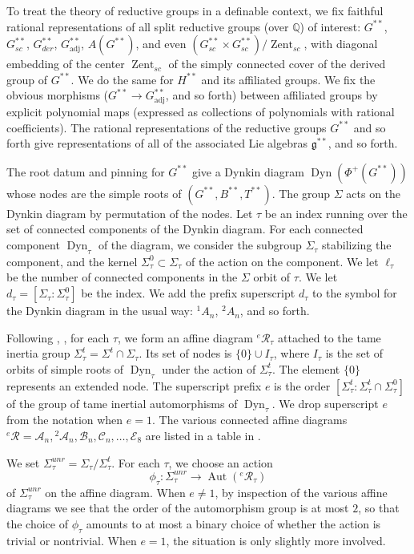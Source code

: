 \documentclass[12pt]{amsart}
\newcommand{\op}[1]{\operatorname{#1}}
\newcommand{\ring}[1]{{\mathbb #1}}
\newcommand{\cal}[1]{\mathcal{#1}}
\def\R{\cal{R}}
\newcommand{\fg}{\mathfrak{g}}
\theoremstyle{plain}
\theoremstyle{definition}
\begin{document}
To treat the theory of reductive groups in a definable context, we fix
faithful rational representations of all split reductive groups (over
$\ring{Q}$) of interest: $G^{**}$, $G^{**}_{sc}$, $G^{**}_{der}$,
$G^{**}_{\op{adj}}$, $A(G^{**})$, and even $(G^{**}_{sc}\times
G^{**}_{sc})/\op{Zent}_{sc}$, with diagonal embedding of the center
$\op{Zent}_{sc}$ of the simply connected cover of the derived group of
$G^{**}$.  We do the same for $H^{**}$ and its affiliated groups.  We
fix the obvious morphisms ($G^{**}\to G^{**}_{\op{adj}}$, and so forth)
between affiliated groups by explicit polynomial maps (expressed as
collections of polynomials with rational coefficients).  The rational
representations of the reductive groups $G^{**}$ and so forth give
representations of all of the associated Lie algebras $\fg^{**}$, and
so forth.

The root datum and pinning for $G^{**}$ give a Dynkin diagram
$\op{Dyn}(\Phi^+(G^{**}))$ whose nodes are the simple roots of
$(G^{**},B^{**},T^{**})$.  The group $\Sigma$ acts on the Dynkin
diagram by permutation of the nodes.  Let $\tau$ be an index running
over the set of connected components of the Dynkin diagram.  For each
connected component $\op{Dyn}_\tau$ of the diagram, we consider the
subgroup $\Sigma_\tau$ stabilizing the component, and the kernel
$\Sigma^0_\tau\subset \Sigma_\tau$ of the action on the component.
We let $\ell_\tau$ be the number of connected components in the
$\Sigma$ orbit of $\tau$.  We let $d_\tau =
[\Sigma_\tau:\Sigma_\tau^0]$ be the index.  We add the prefix
superscript $d_\tau$ to the symbol for the Dynkin diagram in the
usual way: ${}^1A_n$, ${}^2A_n$, and so forth.

Following \cite{reeder2010torsion}, \cite{Gross}, for each $\tau$, we
form an affine diagram ${}^e\R_\tau$ attached to the tame inertia
group $\Sigma^t_\tau = \Sigma^t\cap \Sigma_\tau$.  Its set of nodes is
$\{0\}\cup I_\tau$, where $I_\tau$ is the set of orbits of simple
roots of $\op{Dyn}_\tau$ under the action of $\Sigma^t_\tau$.  The
element $\{0\}$ represents an extended node.  The superscript prefix
$e$ is the order $[\Sigma^t_\tau:\Sigma^t_\tau\cap \Sigma_\tau^0]$ of
the group of tame inertial automorphisms of $\op{Dyn}_\tau$.  We drop
superscript $e$ from the notation when $e=1$.  The various connected
affine diagrams ${}^e\R = \cal{A}_n, {}^2\cal{A}_n, \cal{B}_n,
\cal{C}_n,\ldots, \cal{E}_8$ are listed in a table in \cite{Gross}.

We set $\Sigma^{unr}_\tau = \Sigma_\tau/\Sigma^t_\tau$.
For each $\tau$, we choose an action
\[
\phi_\tau:\Sigma^{unr}_\tau\to \op{Aut}({}^e\R_\tau)
\]
of $\Sigma^{unr}_\tau$ on the affine diagram.  When $e\ne 1$, by
inspection of the various affine diagrams we see that the order of the
automorphism group is at most $2$, so that the choice of $\phi_\tau$
amounts to at most a binary choice of whether the action is trivial or
nontrivial.  When $e=1$, the situation is only slightly more
involved.
\end{document}

